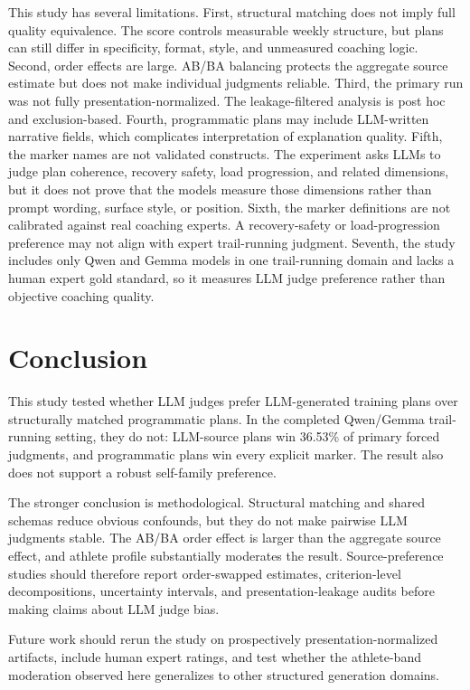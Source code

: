 \documentclass[11pt]{article}
\begin{document}
This study has several limitations. First, structural matching does not imply full quality equivalence. The score controls measurable weekly structure, but plans can still differ in specificity, format, style, and unmeasured coaching logic. Second, order effects are large. AB/BA balancing protects the aggregate source estimate but does not make individual judgments reliable. Third, the primary run was not fully presentation-normalized. The leakage-filtered analysis is post hoc and exclusion-based. Fourth, programmatic plans may include LLM-written narrative fields, which complicates interpretation of explanation quality. Fifth, the marker names are not validated constructs. The experiment asks LLMs to judge plan coherence, recovery safety, load progression, and related dimensions, but it does not prove that the models measure those dimensions rather than prompt wording, surface style, or position. Sixth, the marker definitions are not calibrated against real coaching experts. A recovery-safety or load-progression preference may not align with expert trail-running judgment. Seventh, the study includes only Qwen and Gemma models in one trail-running domain and lacks a human expert gold standard, so it measures LLM judge preference rather than objective coaching quality.

\section{Conclusion}

This study tested whether LLM judges prefer LLM-generated training plans over structurally matched programmatic plans. In the completed Qwen/Gemma trail-running setting, they do not: LLM-source plans win 36.53\% of primary forced judgments, and programmatic plans win every explicit marker. The result also does not support a robust self-family preference.

The stronger conclusion is methodological. Structural matching and shared schemas reduce obvious confounds, but they do not make pairwise LLM judgments stable. The AB/BA order effect is larger than the aggregate source effect, and athlete profile substantially moderates the result. Source-preference studies should therefore report order-swapped estimates, criterion-level decompositions, uncertainty intervals, and presentation-leakage audits before making claims about LLM judge bias.

Future work should rerun the study on prospectively presentation-normalized artifacts, include human expert ratings, and test whether the athlete-band moderation observed here generalizes to other structured generation domains.
\end{document}
